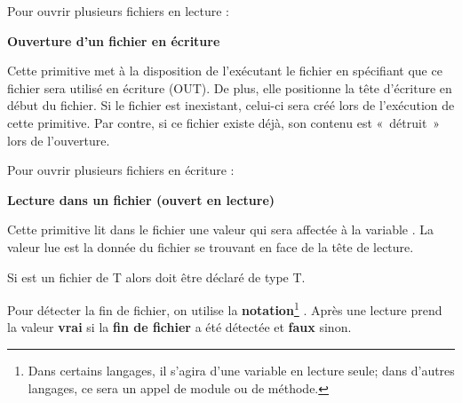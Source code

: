 Pour ouvrir plusieurs fichiers en lecture :


{\sffamily\bfseries\upshape
Ouverture d’un fichier en écriture }


Cette primitive met à la disposition de l’exécutant le fichier
 en spécifiant que ce fichier sera
utilisé en écriture (OUT). De plus, elle positionne la tête d’écriture
en début du fichier. Si le fichier  est
inexistant, celui-ci sera créé lors de l’exécution de cette primitive.
Par contre, si ce fichier existe déjà, son contenu est «~détruit~» lors
de l'ouverture.

Pour ouvrir plusieurs fichiers en écriture :


{\sffamily\bfseries\upshape
Lecture dans un fichier (ouvert en lecture) }


Cette primitive lit dans le fichier  une
valeur qui sera affectée à la variable .
La valeur lue est la donnée du fichier se trouvant en face de la tête
de lecture. 

Si  est un fichier de T alors
 doit être déclaré de type T.

Pour détecter la fin de fichier, on utilise la
\textbf{notation}\footnote{Dans certains langages, il
s'agira d'une variable en lecture
seule; dans d'autres langages, ce sera un appel de
module ou de méthode.} .
Après une lecture  prend la valeur
\textbf{vrai} si la \textbf{fin de fichier} a été détectée et
\textbf{faux} sinon.


